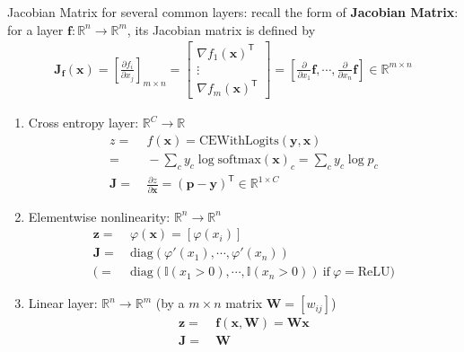 Jacobian Matrix for several common layers: recall the form of \textbf{Jacobian Matrix}: for a layer $\bm{f}:\mathbb{R}^n\to\mathbb{R}^m$, 
its Jacobian matrix is defined by 
\begin{gather}
    \mathbf{J}_{\bm{f}}(\bm{x})
    = \left[\frac{\partial f_i}{\partial x_j}\right]_{m\times n}
    = \left[\begin{array}{c}
        \nabla f_1(\bm{x})^\mathsf{T} \\
        \vdots \\
        \nabla f_m(\bm{x})^\mathsf{T}
    \end{array}\right]
    = \left[\frac{\partial}{\partial x_1}\bm{f},\cdots,\frac{\partial}{\partial x_n}\bm{f}\right]
    \in \mathbb{R}^{m\times n}
\end{gather}
\begin{enumerate}[{(1)}]
    \item Cross entropy layer: $\mathbb{R}^C\to\mathbb{R}$
    \begin{align}
        z 
        =&~ f(\bm{x}) = \mathrm{CEWithLogits}(\bm{y},\bm{x}) \\
        =&~ -\sum_c y_c\log\mathrm{softmax}(\bm{x})_c = \sum_c y_c\log p_c \\
        \mathbf{J} 
        =&~ \frac{\partial z}{\partial \bm{x}}=(\bm{p}-\bm{y})^\mathsf{T}\in\mathbb{R}^{1\times{C}} 
    \end{align}
    \item Elementwise nonlinearity: $\mathbb{R}^n\to\mathbb{R}^n$
    \begin{align}
        \bm{z}
        =&~ \varphi(\bm{x}) = [\varphi(x_i)] \\
        \mathbf{J}
        =&~ \mathrm{diag}{(\varphi'(x_1),\cdots,\varphi'(x_n))} \\
        (=&~ \mathrm{diag}{(\mathbb{I}(x_1>0),\cdots,\mathbb{I}(x_n>0))}~\text{if}~\varphi=\mathrm{ReLU})
    \end{align}
    \item Linear layer: $\mathbb{R}^n\to\mathbb{R}^m$ (by a $m\times n$ matrix $\mathbf{W}=[w_{ij}]$)
    \begin{align}
        \bm{z}
        =&~ \bm{f}(\bm{x},\mathbf{W}) = \mathbf{W}\bm{x} \\
        \mathbf{J}
        =&~ \mathbf{W} 
    \end{align}

\end{enumerate}
